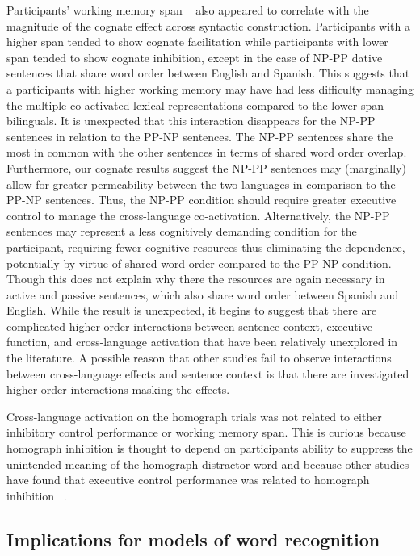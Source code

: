 Participants' working memory span ~\citep{Unsworth2005} also appeared to correlate with the magnitude of the cognate effect across syntactic construction. Participants with a higher span tended to show cognate facilitation while participants with lower span tended to show cognate inhibition, except in the case of NP-PP dative sentences that share word order between English and Spanish. This suggests that a participants with higher working memory may have had less difficulty managing the multiple co-activated lexical representations compared to the lower span bilinguals. It is unexpected that this interaction disappears for the NP-PP sentences in relation to the PP-NP sentences. The NP-PP sentences share the most in common with the other sentences in terms of shared word order overlap. Furthermore, our cognate results suggest the NP-PP sentences may (marginally) allow for greater permeability between the two languages in comparison to the PP-NP sentences. Thus, the NP-PP condition should require greater executive control to manage the cross-language co-activation. Alternatively, the NP-PP sentences may represent a less cognitively demanding condition for the participant, requiring fewer cognitive resources thus eliminating the dependence, potentially by virtue of shared word order compared to the PP-NP condition. Though this does not explain why there the resources are again necessary in active and passive sentences, which also share word order between Spanish and English. While the result is unexpected, it begins to suggest that there are complicated higher order interactions between sentence context, executive function, and cross-language activation that have been relatively unexplored in the literature. A possible reason that other studies fail to observe interactions between cross-language effects and sentence context is that there are investigated higher order interactions masking the effects. 

Cross-language activation on the homograph trials was not related to either inhibitory control performance or working memory span. This is curious because homograph inhibition is thought to depend on participants ability to suppress the unintended meaning of the homograph distractor word and because other studies have found that executive control performance was related to homograph inhibition ~\citep[e.g.,][]{Pivneva2014}.

\subsection{Implications for models of word recognition}
\label{implicationsformodelsofwordrecognition}


